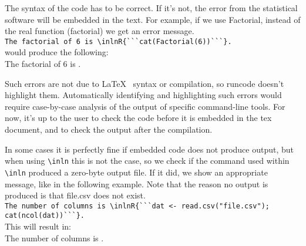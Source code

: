 \documentclass[a4paper,10pt]{article}
\begin{document}
The syntax of the code has to be correct. If it's not, the error from the statistical software will be embedded in the text. For example, if we use Factorial, instead of the real function (factorial) we get an error message.\\
\verb|The factorial of 6 is \inlnR{```cat(Factorial(6))```}.|\\
would produce the following:\\
The factorial of 6 is .

Such errors are not due to \LaTeX~ syntax or compilation, so runcode doesn't highlight them. Automatically identifying and highlighting such errors would require case-by-case analysis of the output of specific command-line tools. For now, it's up to the user to check the code before it is embedded in the tex document, and to check the output after the compilation.

In some cases it is perfectly fine if embedded code does not produce output, but when using \verb|\inln| this is not the case, so we check if the command used within \verb|\inln| produced a zero-byte output file. If it did, we show an appropriate message, like in the following example. Note that the reason no output is produced is that file.csv does not exist.\\
\verb|The number of columns is \inlnR{```dat <- read.csv("file.csv"); cat(ncol(dat))```}.|\\
This will result in:\\
The number of columns is  .
%



\end{document}
